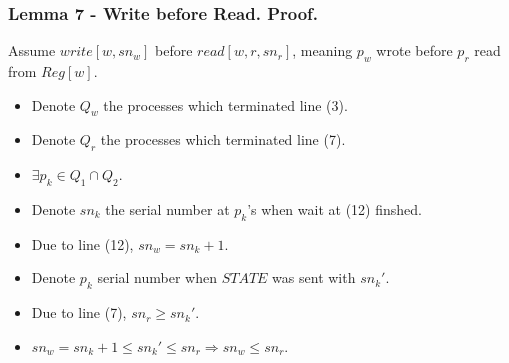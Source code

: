 \begin{frame}
    \frametitle{Lemma 7 - Write before Read. Proof.}
    Assume $write[w,sn_w]$ before $read[w,r,sn_r]$, meaning $p_w$ wrote 
    before $p_r$ read from $Reg[w]$.
    \begin{itemize}
        \item Denote $Q_w$ the processes which terminated line (3).
        \item Denote $Q_r$ the processes which terminated line (7).
        \item $\exists p_k\in Q_1\cap Q_2$.
        \item Denote $sn_k$ the serial number at $p_k$'s when wait at (12) finshed.
        \item Due to line (12), $sn_w=sn_k+1$.
        \item Denote $p_k$ serial number when $STATE$ was sent with $sn_k'$.
        \item Due to line (7), $sn_r\geq sn_k'$.
        \item $sn_w=sn_k+1\leq sn_k'\leq sn_r\Rightarrow sn_w\leq sn_r$.
    \end{itemize}


\end{frame}

